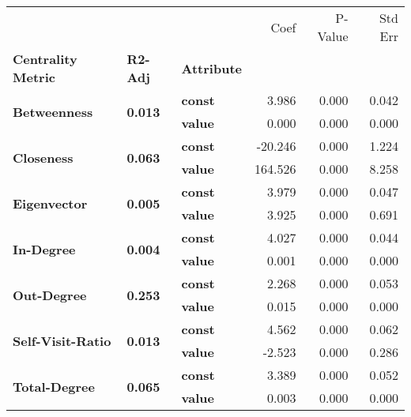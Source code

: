 \begin{tabular}{lllrrr}
\toprule
             &       &       &    Coef &  P-Value &  Std Err \\
\textbf{Centrality Metric} & \textbf{R2-Adj} & \textbf{Attribute} &         &          &          \\
\midrule
\multirow{2}{*}{\textbf{Betweenness}} & \multirow{2}{*}{\textbf{0.013}} & \textbf{const} &   3.986 &    0.000 &    0.042 \\
             &       & \textbf{value} &   0.000 &    0.000 &    0.000 \\
\cline{1-6}
\cline{2-6}
\multirow{2}{*}{\textbf{Closeness}} & \multirow{2}{*}{\textbf{0.063}} & \textbf{const} & -20.246 &    0.000 &    1.224 \\
             &       & \textbf{value} & 164.526 &    0.000 &    8.258 \\
\cline{1-6}
\cline{2-6}
\multirow{2}{*}{\textbf{Eigenvector}} & \multirow{2}{*}{\textbf{0.005}} & \textbf{const} &   3.979 &    0.000 &    0.047 \\
             &       & \textbf{value} &   3.925 &    0.000 &    0.691 \\
\cline{1-6}
\cline{2-6}
\multirow{2}{*}{\textbf{In-Degree}} & \multirow{2}{*}{\textbf{0.004}} & \textbf{const} &   4.027 &    0.000 &    0.044 \\
             &       & \textbf{value} &   0.001 &    0.000 &    0.000 \\
\cline{1-6}
\cline{2-6}
\multirow{2}{*}{\textbf{Out-Degree}} & \multirow{2}{*}{\textbf{0.253}} & \textbf{const} &   2.268 &    0.000 &    0.053 \\
             &       & \textbf{value} &   0.015 &    0.000 &    0.000 \\
\cline{1-6}
\cline{2-6}
\multirow{2}{*}{\textbf{Self-Visit-Ratio}} & \multirow{2}{*}{\textbf{0.013}} & \textbf{const} &   4.562 &    0.000 &    0.062 \\
             &       & \textbf{value} &  -2.523 &    0.000 &    0.286 \\
\cline{1-6}
\cline{2-6}
\multirow{2}{*}{\textbf{Total-Degree}} & \multirow{2}{*}{\textbf{0.065}} & \textbf{const} &   3.389 &    0.000 &    0.052 \\
             &       & \textbf{value} &   0.003 &    0.000 &    0.000 \\
\bottomrule
\end{tabular}
